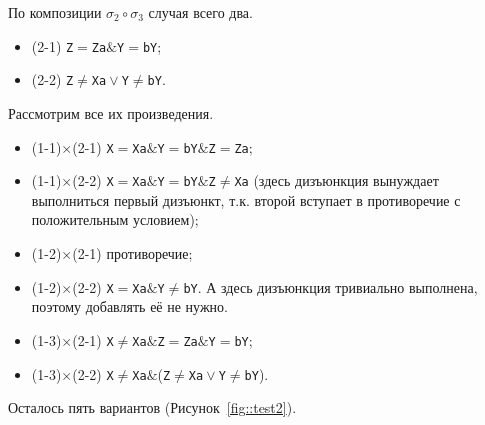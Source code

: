 \documentclass[12pt]{article}
\def\logand{\mathrel{\&}}
\def\logor{\mathrel{\vee}}
\begin{document}
По композиции $\sigma_2\circ\sigma_3$ случая всего два.

\begin{itemize}
\item (2-1) \verb|Z|$=$\verb|Za|$\logand$\verb|Y|$=$\verb|bY|;
\item (2-2) \verb|Z|$\neq$\verb|Xa|$\logor$\verb|Y|$\neq$\verb|bY|.
\end{itemize}  
 
Рассмотрим все их произведения. 

\begin{itemize}
\item (1-1)$\times$(2-1) \verb|X|$=$\verb|Xa|$\logand$\verb|Y|$=$\verb|bY|$\logand$\verb|Z|$=$\verb|Za|;
\item (1-1)$\times$(2-2) \verb|X|$=$\verb|Xa|$\logand$\verb|Y|$=$\verb|bY|$\logand$\verb|Z|$\neq$\verb|Xa| (здесь дизъюнкция вынуждает выполниться первый дизъюнкт, т.к. второй вступает в противоречие с положительным условием);
\item (1-2)$\times$(2-1) противоречие;
\item (1-2)$\times$(2-2) \verb|X|$=$\verb|Xa|$\logand$\verb|Y|$\neq$\verb|bY|. А здесь дизъюнкция тривиально выполнена, поэтому добавлять её не нужно.
\item (1-3)$\times$(2-1) \verb|X|$\neq$\verb|Xa|$\logand$\verb|Z|$=$\verb|Za|$\logand$\verb|Y|$=$\verb|bY|;
\item (1-3)$\times$(2-2) \verb|X|$\neq$\verb|Xa|$\logand$(\verb|Z|$\neq$\verb|Xa|$\logor$\verb|Y|$\neq$\verb|bY|).
\end{itemize}  

Осталось пять вариантов (Рисунок~\ref{fig::test2}). 
\end{document}
